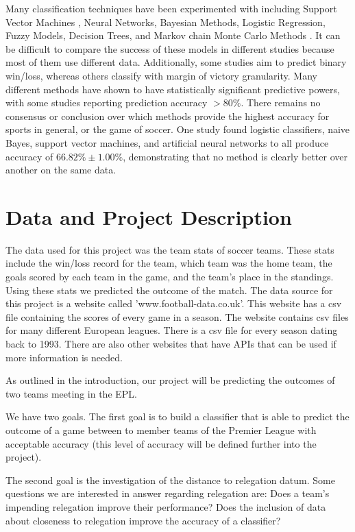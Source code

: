 \documentclass[conference]{IEEEtran}
\begin{document}
 Many classification techniques have been experimented with including Support Vector Machines \cite{Cao:2012aa}, Neural Networks\cite{McCabe:2008aa}, Bayesian Methods\cite{Buursma:2011aa}, Logistic Regression\cite{Cao:2012aa,Buursma:2011aa}, Fuzzy Models\cite{Trawinski:2010aa}, Decision Trees\cite{Zdravevski:2010aa}, and Markov chain Monte Carlo Methods \cite{Rue:2000aa}. It can be difficult to compare the success of these models in different studies because most of them use different data. Additionally, some studies aim to predict binary win/loss, whereas others \cite{Rotshtein:2005aa} classify with margin of victory granularity. Many different methods have shown to have statistically significant predictive powers, with some studies reporting prediction accuracy $>80\%$\cite{Ivankovic:2010aa}. There remains no consensus or conclusion over which methods provide the highest accuracy for sports in general, or the game of soccer. One study \cite{Cao:2012aa} found logistic classifiers, naive Bayes, support vector machines, and artificial neural networks to all produce accuracy of $66.82\% \pm 1.00\%$, demonstrating that no method is clearly better over another on the same data.

\section{Data and Project Description}
The data used for this project was the team stats of soccer teams. These stats include the win/loss record for the team, which team was the home team, the goals scored by each team in the game, and the team's place in the standings. Using these stats we predicted the outcome of the match.
The data source for this project is a website called 'www.football-data.co.uk'\cite{football_data}. This website has a csv file containing the scores of every game in a season. The website contains csv files for many different European leagues. There is a csv file for every season dating back to 1993. There are also other websites that have APIs that can be used if more information is needed.

As outlined in the introduction, our project will be predicting the outcomes of two teams meeting in the EPL.

We have two goals. The first goal is to build a classifier that is  able to predict the outcome of a game between to member teams of the Premier League with acceptable accuracy (this level of accuracy will be defined further into the project).

The second goal is the investigation of the distance to relegation datum. Some questions we are interested in answer regarding relegation are:
Does a team's impending relegation improve their performance?
Does the inclusion of data about closeness to relegation improve the accuracy of a classifier?
\end{document}
